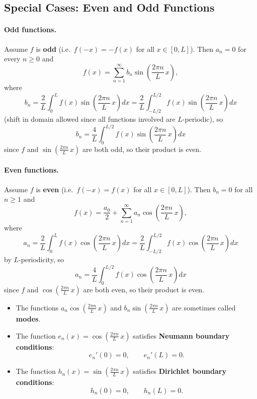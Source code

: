\subsection{Special Cases: Even and Odd Functions}

\paragraph{Odd functions.}
Assume $f$ is \textbf{odd} (i.e.\ $f(-x) = -f(x)$ for all $x \in [0, L]$). Then $a_n = 0$ for every $n \geq 0$ and
\[
f(x) = \sum_{n=1}^{\infty} b_n \sin\!\left(\frac{2\pi n}{L}\,x\right),
\]
where
\[
b_n = \frac{2}{L}\int_0^L f(x) \sin\!\left(\frac{2\pi n}{L}\,x\right)dx
= \frac{2}{L}\int_{-L/2}^{L/2} f(x) \sin\!\left(\frac{2\pi n}{L}\,x\right)dx
\]
(shift in domain allowed since all functions involved are $L$-periodic), so
\[
b_n = \frac{4}{L}\int_0^{L/2} f(x) \sin\!\left(\frac{2\pi n}{L}\,x\right)dx
\]
since $f$ and $\sin\!\left(\tfrac{2\pi n}{L}\,x\right)$ are both odd, so their product is even.

\paragraph{Even functions.}
Assume $f$ is \textbf{even} (i.e.\ $f(-x) = f(x)$ for all $x \in [0, L]$). Then $b_n = 0$ for all $n \geq 1$ and
\[
f(x) = \frac{a_0}{2} + \sum_{n=1}^{\infty} a_n \cos\!\left(\frac{2\pi n}{L}\,x\right),
\]
where
\[
a_n = \frac{2}{L}\int_0^L f(x) \cos\!\left(\frac{2\pi n}{L}\,x\right)dx
= \frac{2}{L}\int_{-L/2}^{L/2} f(x) \cos\!\left(\frac{2\pi n}{L}\,x\right)dx
\]
by $L$-periodicity, so
\[
a_n = \frac{4}{L}\int_0^{L/2} f(x) \cos\!\left(\frac{2\pi n}{L}\,x\right)dx
\]
since $f$ and $\cos\!\left(\tfrac{2\pi n}{L}\,x\right)$ are both even, so their product is even.

\begin{remark}
\begin{itemize}
\item The functions $a_n \cos\!\left(\tfrac{2\pi n}{L}\,x\right)$ and $b_n \sin\!\left(\tfrac{2\pi n}{L}\,x\right)$ are sometimes called \textbf{modes}.
\item The function $e_n(x) = \cos\!\left(\tfrac{2\pi n}{L}\,x\right)$ satisfies \textbf{Neumann boundary conditions}:
\[
\boxed{e_n'(0) = 0, \qquad e_n'(L) = 0.}
\]
\item The function $h_n(x) = \sin\!\left(\tfrac{2\pi n}{L}\,x\right)$ satisfies \textbf{Dirichlet boundary conditions}:
\[
\boxed{h_n(0) = 0, \qquad h_n(L) = 0.}
\]
\end{itemize}
\end{remark}

